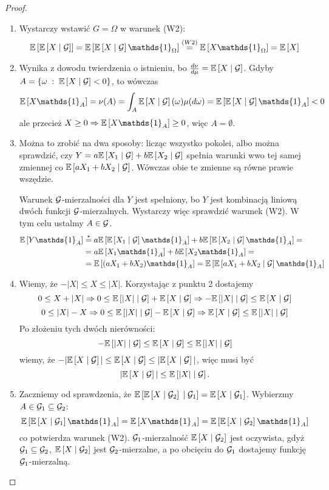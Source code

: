 \begin{proof}
  \begin{enumerate}
    \item Wystarczy wstawić $G=\Omega$ w warunek (W2):
      $$\expected{\expected{X}{\set{G}}}=\expected{\expected{X}{\set{G}}\mathds{1}_\Omega}\overset{(W2)}{=}
      \expected{X\mathds{1}_\Omega}=\expected{X}$$
    \item Wynika z dowodu twierdzenia o istnieniu, bo $\frac{d\nu}{d\mu}=\expected{X}{\set{G}}$. Gdyby $A=\{\omega\;:\;\expected{X}{\set{G}}<0\}$, to wówczas
      $$\expected{X\mathds{1}_A}=\nu(A)=\int_A\expected{X}{\set{G}}(\omega)\mu(d\omega)=\expected{\expected{X}{\set{G}}\mathds{1}_A}<0$$
        ale przecież $X\geq0\implies\expected{X\mathds{1}_A}\geq0$, więc $A=\emptyset$.
      \item Można to zrobić na dwa sposoby: licząc wszystko pokolei, albo można sprawdzić, czy $Y=a\expected{X_1}{\set{G}}+b\expected{X_2}{\set{G}}$ spełnia warunki wwo tej samej zmiennej co $\expected{aX_1+bX_2}{\set{G}}$. Wówczas obie te zmienne są równe prawie wszędzie.

        Warunek $\mathcal{G}$-mierzalności dla $Y$ jest spełniony, bo $Y$ jest kombinacją liniową dwóch funkcji $\mathcal{G}$-mierzalnych. Wystarczy więc sprawdzić warunek (W2). W tym celu ustalmy $A\in\mathcal{G}$.
        \begin{align*}
          \expected{Y\mathds{1}_A}&\overset{\star}{=}a\expected{\expected{X_1}{\set{G}}\mathds{1}_A}+b\expected{\expected{X_2}{\set{G}}\mathds{1}_A}=\\
                                  &=a\expected{X_1\mathds{1}_A}+b\expected{X_2\mathds{1}_A}=\\
                                  &=\expected{(aX_1+bX_2)\mathds{1}_A}=\expected{\expected{aX_1+bX_2}{\set{G}}\mathds{1}_A}
        \end{align*}
      \item Wiemy, że $-|X|\leq X\leq|X|$. Korzystając z punktu 2 dostajemy
        $$0\leq X+|X|\implies 0\leq \expected{|X|}{\set{G}}+\expected{X}{\set{G}}\implies -\expected{|X|}{\set{G}}\leq\expected{X}{\set{G}}$$
        $$0\leq |X|-X\implies 0\leq \expected{|X|}{\set{G}}-\expected{X}{\set{G}}\implies \expected{X}{\set{G}}\leq\expected{|X|}{\set{G}}$$
        Po złożeniu tych dwóch nierówności:
        $$-\expected{|X|}{\set{G}}\leq\expected{X}{\set{G}}\leq\expected{|X|}{\set{G}}$$
        wiemy, że $-|\expected{X}{\set{G}}|\leq\expected{X}{\set{G}}\leq|\expected{X}{\set{G}}|$, więc musi być
        $$|\expected{X}{\set{G}}|\leq\expected{|X|}{\set{G}}.$$
      \item Zaczniemy od sprawdzenia, że $\expected{\expected{X}{\set{G}_2}}{\set{G}_1}=\expected{X}{\set{G}_1}$. Wybierzmy $A\in\mathcal{G}_1\subseteq\mathcal{G}_2$:
        $$\expected{\expected{X}{\set{G}_1}\mathds{1}_A}=\expected{X\mathds{1}_A}=\expected{\expected{X}{\set{G}_2}\mathds{1}_A}$$
        co potwierdza warunek (W2). $\mathcal{G}_1$-mierzalność $\expected{X}{\set{G}_2}$ jest oczywista, gdyż $\mathcal{G}_1\subseteq\mathcal{G}_2$, $\expected{X}{\set{G}_2}$ jest $\mathcal{G}_2$-mierzalne, a po obcięciu do $\mathcal{G}_1$ dostajemy funkcję $\mathcal{G}_1$-mierzalną.


\end{enumerate}
\end{proof}
